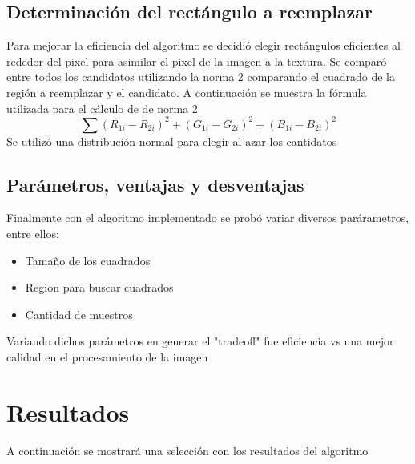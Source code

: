 \documentclass[conference]{IEEEtran}
\begin{document}
\subsection{Determinación del rectángulo a reemplazar}
Para mejorar la eficiencia del algoritmo se decidió elegir rectángulos eficientes al rededor del pixel para asimilar el pixel de la imagen a la textura. Se comparó entre todos los candidatos utilizando la norma 2 comparando el cuadrado de la región a reemplazar y el candidato. A continuación se muestra la fórmula utilizada para el cálculo de de norma 2
\begin{equation}
\sum{(R_{1i}-R_{2i})^2+(G_{1i}-G_{2i})^2+(B_{1i}-B_{2i})^2}
\end{equation}
Se utilizó una distribución normal para elegir al azar los cantidatos 
\subsection{Parámetros, ventajas y desventajas}
Finalmente con el algoritmo implementado se probó variar diversos parárametros, entre ellos:
\begin{itemize}
	\item Tamaño de los cuadrados
	\item Region para buscar cuadrados
	\item Cantidad de muestros
\end{itemize}
Variando dichos parámetros en generar el "tradeoff" fue eficiencia vs una mejor calidad en el procesamiento de la imagen
\section{Resultados}
A continuación se mostrará una selección con los resultados del algoritmo
\end{document}
